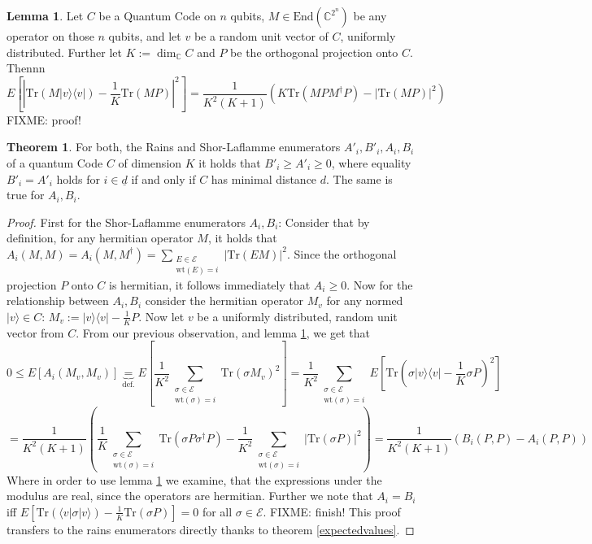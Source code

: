 \documentclass{article}
\def\E{\mathcal{E}}
\def\C{\mathbb{C}}
\def\End{\text{End}}
\def\Tr{\text{Tr}}
\def\wt{\text{wt}}
\theoremstyle{definition}
\newtheorem{theorem}[Satz]{Theorem}
\newtheorem{lem}[Satz]{Lemma}
\begin{document}
\begin{lem}\label{expvalvec}
Let $C$ be a Quantum Code on $n$ qubits, $M \in \End(\C^{2^n})$ be any operator on those $n$ qubits, and let $v$ be a random unit vector of $C$, uniformly distributed. Further let $K:= \dim_\C C$ and $P$ be the orthogonal projection onto $C$. Thennn
\begin{equation} E[|\Tr(M|v\rangle \langle v|) - \frac{1}{K}\Tr(MP)|^2] = \frac{1}{K^2(K+1)}(K \Tr(MPM^\dagger P) - |\Tr(MP)|^2) \end{equation}
FIXME: proof!
\end{lem}


\begin{theorem}
For both, the Rains and Shor-Laflamme enumerators $A'_i, B'_i, A_i, B_i$ of a quantum Code $C$ of dimension $K$ it holds that $B'_i \geq A'_i \geq 0$, where equality $B'_i = A'_i$  holds for $i \in \underline{d}$ if and only if $C$ has minimal distance $d$. The same is true for $A_i, B_i$.
\begin{proof}
First for the Shor-Laflamme enumerators $A_i, B_i$: Consider that by definition, for any hermitian operator $M$, it holds that $A_i(M,M) = A_i(M,M^\dagger) = \sum_{\substack{E \in \mathcal{E} \\ \wt(E) = i}} |\Tr(EM)|^2$. Since the orthogonal projection $P$ onto $C$ is hermitian,
it follows immediately that $A_i \geq 0$. Now for the relationship between $A_i,B_i$ consider the hermitian operator $M_v$ for any normed $|v \rangle \in C$: $M_v:= |v\rangle \langle v| - \frac{1}{K}P$. Now let $v$ be a uniformly distributed, random unit vector from $C$.
From our previous observation, and lemma \ref{expvalvec}, we get that
\begin{equation} 0 \leq E[A_i(M_v,M_v)] \underbrace{=}_{\text{def.}} E[\frac{1}{K^2} \sum_{\substack{\sigma \in \mathcal{E} \\ \wt(\sigma) = i}} \Tr(\sigma M_v)^2] = \frac{1}{K^2}  \sum_{\substack{\sigma \in \mathcal{E} \\ \wt(\sigma) = i}} E[\Tr(\sigma |v\rangle \langle v| - \frac{1}{K} \sigma P)^2] \end{equation}
\begin{equation} = \frac{1}{K^2(K+1)}(\frac{1}{K} \sum_{\substack{\sigma \in \mathcal{E} \\ \wt(\sigma) = i}}  \Tr(\sigma P \sigma^\dagger P) - \frac{1}{K^2}\sum_{\substack{\sigma \in \mathcal{E} \\ \wt(\sigma) = i}} |\Tr(\sigma P)|^2) = \frac{1}{K^2(K+1)} (B_i(P,P) - A_i(P,P)) \end{equation}
Where in order to use lemma \ref{expvalvec} we examine, that the expressions under the modulus are real, since the operators are hermitian. Further we note that $A_i = B_i$ iff $E[\Tr (\langle v | \sigma |v \rangle) - \frac{1}{K} \Tr(\sigma P)] = 0$ for all $\sigma \in \E$.
FIXME: finish!
This proof transfers to the rains enumerators directly thanks to theorem \ref{expectedvalues}.

\end{proof}

\end{theorem}
\end{document}
